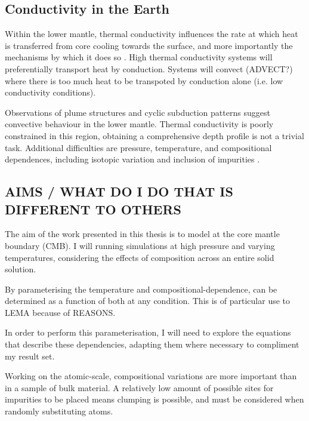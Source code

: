 \subsection{Conductivity in the Earth}

Within the lower mantle, thermal conductivity influences the rate at which heat is transferred from core cooling towards the surface, and more importantly the mechanisms by which it does so \citep{Lay2008}. High thermal conductivity systems will preferentially transport heat by conduction. Systems will convect (ADVECT?) where there is too much heat to be transpoted by conduction alone (i.e. low conductivity conditions).

Observations of plume structures and cyclic subduction patterns \citep[see][]{Garnero2008} suggest convective behaviour in the lower mantle. Thermal conductivity is poorly constrained in this region, obtaining a comprehensive depth profile is not a trivial task. Additional difficulties are pressure, temperature, and compositional dependences, including isotopic variation \citep{Tang2010,Dalton2013,Tang2014} and inclusion of impurities \citep{Manthilake2011,Ammann2014,Ohta2014}.

\subsection{AIMS / WHAT DO I DO THAT IS DIFFERENT TO OTHERS}

The aim of the work presented in this thesis is to model \tcs at the core mantle boundary (CMB). I will running simulations at high pressure and varying temperatures, considering the effects of composition across an entire solid solution. 

By parameterising the temperature and compositional-dependence, \tcs can be determined as a function of both at any condition. This is of particular use to LEMA because of REASONS. 

In order to perform this parameterisation, I will need to explore the equations that describe these dependencies, adapting them where necessary to compliment my result set.

Working on the atomic-scale, compositional variations are more important than in a sample of bulk material. A relatively low amount of possible sites for impurities to be placed means clumping is possible, and must be considered when randomly substituting atoms.

